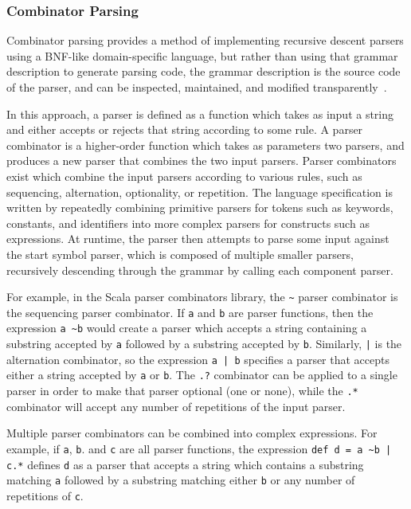 \subsubsection{Combinator Parsing}

Combinator parsing provides a method of implementing recursive descent parsers using a BNF-like domain-specific language,  but rather than using that grammar description to generate parsing code, the grammar description is the source code of the parser, and can be inspected, maintained, and modified transparently~\cite{ghosh2010dsls,hofer2008polymorphic,moors2008parser}.

In this approach, a parser is defined as a function which takes as input a string and either accepts or rejects that string according to some rule. A parser combinator is a higher-order function which takes as parameters two parsers, and produces a new parser that combines the two input parsers. Parser combinators exist which combine the input parsers according to various rules, such as sequencing, alternation, optionality, or repetition. The language specification is written by repeatedly combining primitive parsers for tokens such as keywords, constants, and identifiers into more complex parsers for constructs such as expressions. At runtime, the parser then attempts to parse some input against the start symbol parser, which is composed of multiple smaller parsers, recursively descending through the grammar by calling each component parser.~\cite{moors2008parser,swierstra2001combinator,fokker1995functional,frost2008parser}

For example, in the Scala parser combinators library, the \texttt{\textasciitilde} parser combinator is the sequencing parser combinator. If \texttt{a} and \texttt{b} are parser functions, then the expression \texttt{a \textasciitilde b} would create a parser which accepts a string containing a substring accepted by \texttt{a} followed by a substring accepted by \texttt{b}. Similarly,  \texttt{|} is the alternation combinator, so the expression \texttt{a | b} specifies a parser that accepts either a string accepted by \texttt{a} or \texttt{b}.  The \texttt{.?} combinator can be applied to a single parser in order to make that parser optional (one or none), while the \texttt{.*} combinator will accept any number of repetitions of the input parser. 

Multiple parser combinators can be combined into complex expressions. For example, if \texttt{a}, \texttt{b}. and \texttt{c} are all parser functions, the expression \texttt{def d = a \textasciitilde b | c.*} defines \texttt{d} as a parser that accepts a string which contains a substring matching \texttt{a} followed by a substring matching either \texttt{b} or any number of repetitions of \texttt{c}.

